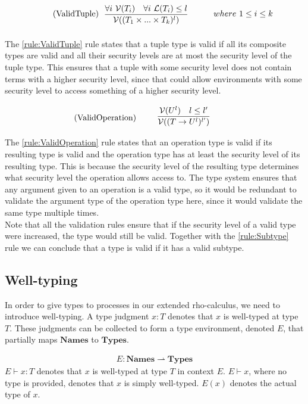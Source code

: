 \begin{align*}
\tag{ValidTuple}\label{rule:ValidTuple} &\infrule{\forall i\ \valid{T_i}\quad \forall i\ \level{T_i}\leq l}{\valid{(T_1 \times...\times T_k)^l}}& where\ 1\leq i\leq k
\end{align*}
The \ref{rule:ValidTuple} rule states that a tuple type is valid if all its composite types are valid and all their security levels are at most the security level of the tuple type.
This ensures that a tuple with some security level does not contain terms with a higher security level, since that could allow environments with some security level to access something of a higher security level.

\begin{align*}
\tag{ValidOperation}\label{rule:ValidOperation} &\infrule{\valid{U^l}\quad l\leq l'}{\valid{(T\ra U^l)^{l'}}}
\end{align*}
The \ref{rule:ValidOperation} rule states that an operation type is valid if its resulting type is valid and the operation type has at least the security level of its resulting type.
This is because the security level of the resulting type determines what security level the operation allows access to.
The type system ensures that any argument given to an operation is a valid type, so it would be redundant to validate the argument type of the operation type here, since it would validate the same type multiple times.\\

Note that all the validation rules ensure that if the security level of a valid type were increased, the type would still be valid. Together with the \ref{rule:Subtype} rule we can conclude that a type is valid if it has a valid subtype.

\subsection{Well-typing}
In order to give types to processes in our extended rho-calculus, we need to introduce well-typing.
A type judgment $x:T$ denotes that $x$ is well-typed at type $T$.
These judgments can be collected to form a type environment, denoted $E$, that partially maps $\mathbf{Names}$ to $\mathbf{Types}$.

\begin{align*}
E: \mathbf{Names} \rightharpoonup \mathbf{Types}
\end{align*}
$E\vdash x:T$ denotes that $x$ is well-typed at type $T$ in context $E$.
$E\vdash x$, where no type is provided, denotes that $x$ is simply well-typed.
$E(x)$ denotes the actual type of $x$.

